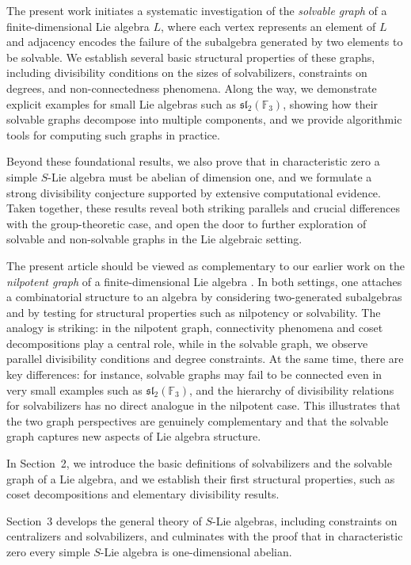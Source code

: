 \documentclass[11pt]{amsart}
\theoremstyle{plain}
\def\F{\mathbb{F}}
\begin{document}
The present work initiates a systematic investigation of the \emph{solvable graph} of a finite-dimensional Lie algebra $L$, where each vertex represents an element of $L$ and adjacency encodes the failure of the subalgebra generated by two elements to be solvable. We establish several basic structural properties of these graphs, including divisibility conditions on the sizes of solvabilizers, constraints on degrees, and non-connectedness phenomena. Along the way, we demonstrate explicit examples for small Lie algebras such as $\mathfrak{sl}_2(\F_3)$, showing how their solvable graphs decompose into multiple components, and we provide algorithmic tools for computing such graphs in practice. 

Beyond these foundational results, we also prove that in characteristic zero a simple $S$-Lie algebra must be abelian of dimension one, and we formulate a strong divisibility conjecture supported by extensive computational evidence. Taken together, these results reveal both striking parallels and crucial differences with the group-theoretic case, and open the door to further exploration of solvable and non-solvable graphs in the Lie algebraic setting.

The present article should be viewed as complementary to our earlier work on the \emph{nilpotent graph} of a finite-dimensional Lie algebra \cite{TGF}. In both settings, one attaches a combinatorial structure to an algebra by considering two-generated subalgebras and by testing for structural properties such as nilpotency or solvability. The analogy is striking: in the nilpotent graph, connectivity phenomena and coset decompositions play a central role, while in the solvable graph, we observe parallel divisibility conditions and degree constraints. At the same time, there are key differences: for instance, solvable graphs may fail to be connected even in very small examples such as $\mathfrak{sl}_{2}(\F_3)$, and the hierarchy of divisibility relations for solvabilizers has no direct analogue in the nilpotent case. This illustrates that the two graph perspectives are genuinely complementary and that the solvable graph captures new aspects of Lie algebra structure.


In Section~2, we introduce the basic definitions of solvabilizers and the solvable graph of a Lie algebra, and we establish their first structural properties, such as coset decompositions and elementary divisibility results. 

Section~3 develops the general theory of $S$-Lie algebras, including constraints on centralizers and solvabilizers, and culminates with the proof that in characteristic zero every simple $S$-Lie algebra is one-dimensional abelian. 
\end{document}
